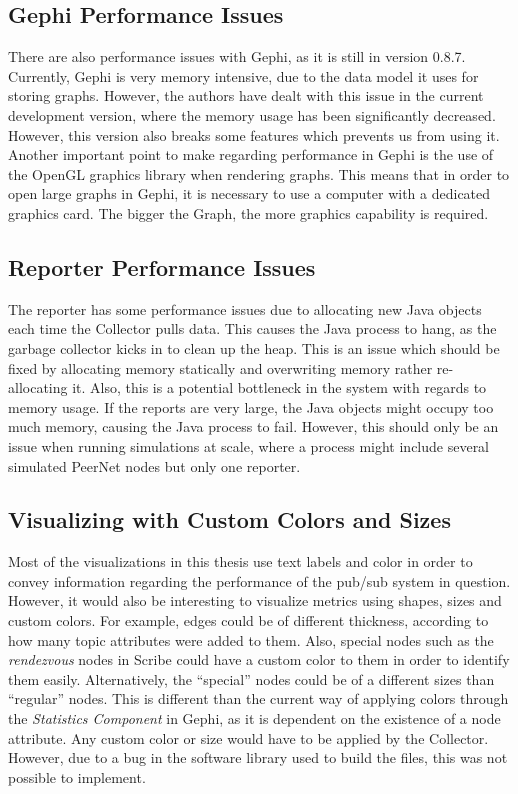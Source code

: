 \subsection{Gephi Performance Issues}

There are also performance issues with Gephi, as it is still in version
0.8.7. Currently, Gephi is very memory intensive, due to the data model
it uses for storing graphs. However, the authors have dealt with this
issue in the current development version, where the memory usage has
been significantly decreased. However, this version also breaks some
features which prevents us from using it. Another important point to
make regarding performance in Gephi is the use of the OpenGL graphics
library when rendering graphs. This means that in order to open large
graphs in Gephi, it is necessary to use a computer with a dedicated
graphics card. The bigger the Graph, the more graphics capability is
required.

\subsection{Reporter Performance Issues}

The reporter has some performance issues due to allocating new Java
objects each time the Collector pulls data. This causes the Java process to
hang, as the garbage collector kicks in to clean up the heap. This is an
issue which should be fixed by allocating memory statically and
overwriting memory rather re-allocating it. Also, this is a potential bottleneck
in the system with regards to memory usage. If the reports are very large, the Java
objects might occupy too much  memory, causing the Java process to
fail. However, this should only be an issue when  running simulations at
scale, where a process might include several simulated PeerNet nodes but only one
reporter.

\subsection{Visualizing with Custom Colors and Sizes}

Most of the visualizations in this thesis use text labels and color in
order to convey information regarding the performance of the pub/sub
system in question. However, it would also be interesting to visualize
metrics using shapes, sizes and custom colors. For example, edges could
be of different thickness, according to how many topic attributes were
added to them. Also, special nodes such as the \emph{rendezvous} nodes
in Scribe could have a custom color to them in order to identify them
easily. Alternatively, the ``special'' nodes could be of a different sizes than
``regular'' nodes. This is different than the current way of applying
colors through the \emph{Statistics Component} in Gephi, as it is
dependent on the existence of a node attribute. Any custom color or size
would have to be applied by the Collector. However, due to a bug in the
software library used to build the \gexf{} files, this was not possible
to implement.


